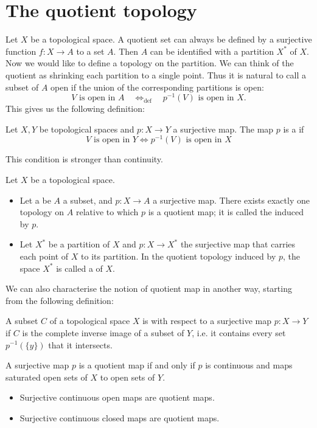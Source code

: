 \section{The quotient topology}
Let $X$ be a topological space. A quotient set can always be defined by a surjective function $f:X\to A$ to a set $A$. Then $A$ can be identified with a partition $X^*$ of $X$. Now we would like to define a topology on the partition. We can think of the quotient as shrinking each partition to a single point. Thus it is natural to call a subset of $A$ open if the union of the corresponding partitions is open:
\[ \text{$V$ is open in $A$}\quad \Leftrightarrow_{\text{def}}\quad \text{$p^{-1}(V)$ is open in $X$}. \]
This gives us the following definition:
\begin{definition}
Let $X,Y$ be topological spaces and $p:X\to Y$ a surjective map. The map $p$ is a  if
\[ \text{$V$ is open in $Y$} \iff \text{$p^{-1}(V)$ is open in $X$} \]
\end{definition}
This condition is stronger than continuity.
\begin{definition}
Let $X$ be a topological space.
\begin{itemize}
\item Let a be $A$ a subset, and $p:X\to A$ a surjective map. There exists exactly one topology on $A$ relative to which $p$ is a quotient map; it is called the  induced by $p$.
\item Let $X^*$ be a partition of $X$ and $p:X\to X^*$ the surjective map that carries each point of $X$ to its partition. In the quotient topology induced by $p$, the space $X^*$ is called a  of $X$.
\end{itemize}
\end{definition}
We can also characterise the notion of quotient map in another way, starting from the following definition:
\begin{definition}
A subset $C$ of a topological space $X$ is  with respect to a surjective map $p:X\to Y$ if $C$ is the complete inverse image of a subset of $Y$, i.e. it contains every set $p^{-1}(\{y\})$ that it intersects.
\end{definition}
\begin{lemma}
A surjective map $p$ is a quotient map \textup{if and only if} $p$ is continuous and maps saturated open sets of $X$ to open sets of $Y$.
\end{lemma}
\begin{corollary}
\begin{itemize}
\item Surjective continuous open maps are quotient maps.
\item Surjective continuous closed maps are quotient maps.
\end{itemize}
\end{corollary}
